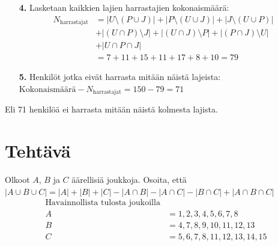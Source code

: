 \documentclass{article}
\newcounter{tehtava}
\begin{document}
\begin{itemize}
\begin{itemize}
        \item[\textbf{4.}]Lasketaan kaikkien lajien harrastajien kokonaismäärä:
        \[
            \begin{aligned}
                N_{\text{harrastajat}} &= |U \setminus (P \cup J)| + |P \setminus (U \cup J)| + |J \setminus (U \cup P)| \\
                &+ |(U \cap P) \setminus J| + |(U \cap J) \setminus P| + |(P \cap J) \setminus U| \\
                &+ |U \cap P \cap J| \\
                &= 7 + 11 + 15 + 11 + 17 + 8 + 10 = 79
            \end{aligned}
        \]
        \item[\textbf{5.}]Henkilöt jotka eivät harrasta mitään näistä lajeista:\newline
        $\text{Kokonaismäärä} - N_{\text{harrastajat}} = 150 - 79 = 71$
    \end{itemize}
    Eli 71 henkilöä ei harrasta mitään näistä kolmesta lajista.
\end{itemize}


\newpage
{}
\section*{Tehtävä \thetehtava}
Olkoot $A$, $B$ ja $C$ äärellisiä joukkoja. Osoita, että \newline
$|A \cup B \cup C| = |A| + |B| + |C| - |A \cap B| - |A \cap C| - |B \cap C| + |A \cap B \cap C|$\newline
\[
    \begin{aligned}
        \text{Havainnollista tulosta joukoilla} \\
        A &= {1, 2, 3, 4, 5, 6, 7, 8}\\
        B &= {4, 7, 8, 9, 10, 11, 12, 13}\\
        C &= {5, 6, 7, 8, 11, 12, 13, 14, 15}\\
    \end{aligned}
\]
\end{document}
